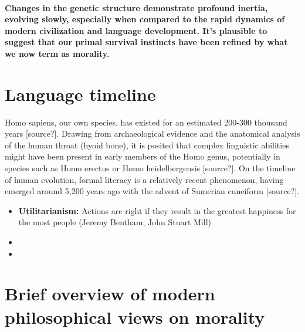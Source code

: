 \documentclass[12pt,a4]{article}
\begin{document}
\paragraph{Changes in the genetic structure demonstrate profound inertia, evolving slowly, especially when compared to the rapid dynamics of modern civilization and language development. It's plausible to suggest that our primal survival instincts have been refined by what we now term as morality.
}


\section{Language timeline}

Homo sapiens, our own species, has existed for an estimated 200-300 thousand years [source?]. Drawing from archaeological evidence and the anatomical analysis of the human throat (hyoid bone), it is posited that complex linguistic abilities might have been present in early members of the Homo genus, potentially in species such as Homo erectus or Homo heidelbergensis [source?]. On the timeline of human evolution, formal literacy is a relatively recent phenomenon, having emerged around 5,200 years ago with the advent of Sumerian cuneiform [source?].


 
\begin{itemize}
    \item \textbf{Utilitarianism:} Actions are right if they result in the greatest happiness for the most people (Jeremy Bentham, John Stuart Mill)
 
    \item 
    
    \item 

\end{itemize}

\section{Brief overview of modern philosophical views on morality}
\end{document}
